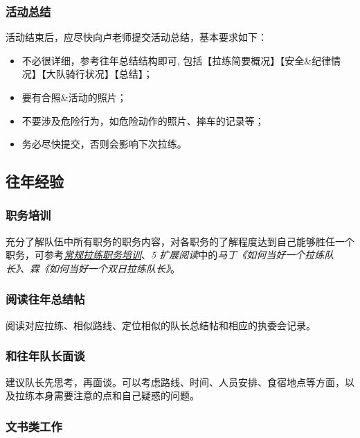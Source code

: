\documentclass[UTF8]{ctexart}
\begin{document}
\subsubsection[活动总结]{\underline{活动总结}}

活动结束后，应尽快向卢老师提交活动总结，基本要求如下：
\begin{itemize}[nosep,left=4em]
    \item 不必很详细，参考往年总结结构即可, 包括【拉练简要概况】【安全\&纪律情况】【大队骑行状况】【总结】；
    \item 要有合照\&活动的照片；
    \item 不要涉及危险行为，如危险动作的照片、摔车的记录等；
    \item 务必尽快提交，否则会影响下次拉练。
\end{itemize}

\subsection{往年经验}

\subsubsection{职务培训}

充分了解队伍中所有职务的职务内容，对各职务的了解程度达到自己能够胜任一个职务，可参考\href{https://chexie.net/bbs/content/?bid=7&tid=1062&p=1}{\textit{常规拉练职务培训}}、{\color{blue}\textit{5 扩展阅读}}中的{\color{blue}\textit{马丁《如何当好一个拉练队长》、霖《如何当好一个双日拉练队长》}}。

\subsubsection{阅读往年总结帖}

阅读对应拉练、相似路线、定位相似的队长总结帖和相应的执委会记录。

\subsubsection{和往年队长面谈}

建议队长先思考，再面谈。可以考虑路线、时间、人员安排、食宿地点等方面，以及拉练本身需要注意的点和自己疑惑的问题。

\subsubsection{文书类工作}
\end{document}
